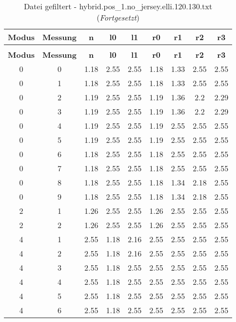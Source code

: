 \begin{longtable}{|c|c||c||c|c||c|c|c|c|}
	\caption{Datei gefiltert - hybrid.pos\_1.no\_jersey.elli.120.130.txt} \label{tab:hybrid.pos-1.no-jersey.elli.120.130.txt} \\ \hline
	\textbf{Modus} & \textbf{Messung} & \textbf{n} & \textbf{l0} & \textbf{l1} & \textbf{r0} & \textbf{r1} & \textbf{r2} & \textbf{r3}\\ \hline
	\endfirsthead
	\caption[]{Datei gefiltert - hybrid.pos\_1.no\_jersey.elli.120.130.txt (\emph{Fortgesetzt})} \\ \hline
	\textbf{Modus} & \textbf{Messung} & \textbf{n} & \textbf{l0} & \textbf{l1} & \textbf{r0} & \textbf{r1} & \textbf{r2} & \textbf{r3}\\ \hline
	\endhead
	0 & 0 & 1.18 & 2.55 & 2.55 & 1.18 & 1.33 & 2.55 & 2.55 \\ \hline
	0 & 1 & 1.18 & 2.55 & 2.55 & 1.18 & 1.33 & 2.55 & 2.55 \\ \hline
	0 & 2 & 1.19 & 2.55 & 2.55 & 1.19 & 1.36 & 2.2 & 2.29 \\ \hline
	0 & 3 & 1.19 & 2.55 & 2.55 & 1.19 & 1.36 & 2.2 & 2.29 \\ \hline
	0 & 4 & 1.19 & 2.55 & 2.55 & 1.19 & 2.55 & 2.55 & 2.55 \\ \hline
	0 & 5 & 1.19 & 2.55 & 2.55 & 1.19 & 2.55 & 2.55 & 2.55 \\ \hline
	0 & 6 & 1.18 & 2.55 & 2.55 & 1.18 & 2.55 & 2.55 & 2.55 \\ \hline
	0 & 7 & 1.18 & 2.55 & 2.55 & 1.18 & 2.55 & 2.55 & 2.55 \\ \hline
	0 & 8 & 1.18 & 2.55 & 2.55 & 1.18 & 1.34 & 2.18 & 2.55 \\ \hline
	0 & 9 & 1.18 & 2.55 & 2.55 & 1.18 & 1.34 & 2.18 & 2.55 \\ \hline
	2 & 1 & 1.26 & 2.55 & 2.55 & 1.26 & 2.55 & 2.55 & 2.55 \\ \hline
	2 & 2 & 1.26 & 2.55 & 2.55 & 1.26 & 2.55 & 2.55 & 2.55 \\ \hline
	4 & 1 & 2.55 & 1.18 & 2.16 & 2.55 & 2.55 & 2.55 & 2.55 \\ \hline
	4 & 2 & 2.55 & 1.18 & 2.16 & 2.55 & 2.55 & 2.55 & 2.55 \\ \hline
	4 & 3 & 2.55 & 1.18 & 2.55 & 2.55 & 2.55 & 2.55 & 2.55 \\ \hline
	4 & 4 & 2.55 & 1.18 & 2.55 & 2.55 & 2.55 & 2.55 & 2.55 \\ \hline
	4 & 5 & 2.55 & 1.18 & 2.55 & 2.55 & 2.55 & 2.55 & 2.55 \\ \hline
	4 & 6 & 2.55 & 1.18 & 2.55 & 2.55 & 2.55 & 2.55 & 2.55 \\ \hline

\end{longtable}
